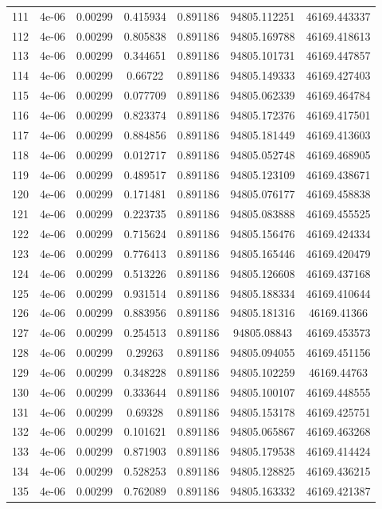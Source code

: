 \begin{table}
\begin{tabular*}{\linewidth}{c|c|c|c|c|c|c}
111 & 4e-06 & 0.00299 & 0.415934 & 0.891186 & 94805.112251 & 46169.443337\\
112 & 4e-06 & 0.00299 & 0.805838 & 0.891186 & 94805.169788 & 46169.418613\\
113 & 4e-06 & 0.00299 & 0.344651 & 0.891186 & 94805.101731 & 46169.447857\\
114 & 4e-06 & 0.00299 & 0.66722 & 0.891186 & 94805.149333 & 46169.427403\\
115 & 4e-06 & 0.00299 & 0.077709 & 0.891186 & 94805.062339 & 46169.464784\\
116 & 4e-06 & 0.00299 & 0.823374 & 0.891186 & 94805.172376 & 46169.417501\\
117 & 4e-06 & 0.00299 & 0.884856 & 0.891186 & 94805.181449 & 46169.413603\\
118 & 4e-06 & 0.00299 & 0.012717 & 0.891186 & 94805.052748 & 46169.468905\\
119 & 4e-06 & 0.00299 & 0.489517 & 0.891186 & 94805.123109 & 46169.438671\\
120 & 4e-06 & 0.00299 & 0.171481 & 0.891186 & 94805.076177 & 46169.458838\\
121 & 4e-06 & 0.00299 & 0.223735 & 0.891186 & 94805.083888 & 46169.455525\\
122 & 4e-06 & 0.00299 & 0.715624 & 0.891186 & 94805.156476 & 46169.424334\\
123 & 4e-06 & 0.00299 & 0.776413 & 0.891186 & 94805.165446 & 46169.420479\\
124 & 4e-06 & 0.00299 & 0.513226 & 0.891186 & 94805.126608 & 46169.437168\\
125 & 4e-06 & 0.00299 & 0.931514 & 0.891186 & 94805.188334 & 46169.410644\\
126 & 4e-06 & 0.00299 & 0.883956 & 0.891186 & 94805.181316 & 46169.41366\\
127 & 4e-06 & 0.00299 & 0.254513 & 0.891186 & 94805.08843 & 46169.453573\\
128 & 4e-06 & 0.00299 & 0.29263 & 0.891186 & 94805.094055 & 46169.451156\\
129 & 4e-06 & 0.00299 & 0.348228 & 0.891186 & 94805.102259 & 46169.44763\\
130 & 4e-06 & 0.00299 & 0.333644 & 0.891186 & 94805.100107 & 46169.448555\\
131 & 4e-06 & 0.00299 & 0.69328 & 0.891186 & 94805.153178 & 46169.425751\\
132 & 4e-06 & 0.00299 & 0.101621 & 0.891186 & 94805.065867 & 46169.463268\\
133 & 4e-06 & 0.00299 & 0.871903 & 0.891186 & 94805.179538 & 46169.414424\\
134 & 4e-06 & 0.00299 & 0.528253 & 0.891186 & 94805.128825 & 46169.436215\\
135 & 4e-06 & 0.00299 & 0.762089 & 0.891186 & 94805.163332 & 46169.421387\\
\end{tabular*}
\end{table}

